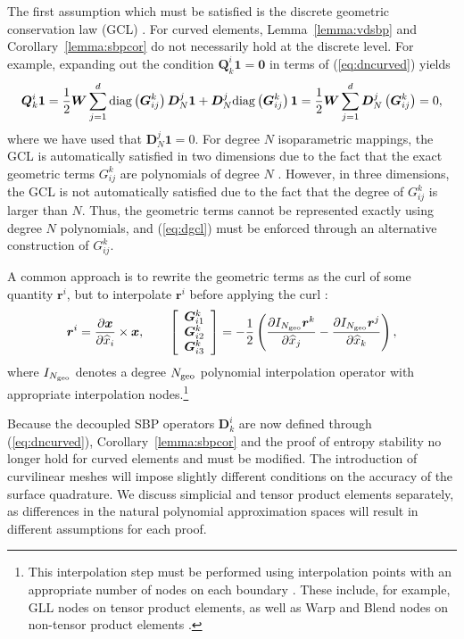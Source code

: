 \documentclass[review]{siamart0216}
\theoremstyle{assumption}
\renewcommand{\hat}[1]{\hat{#1}}
\newcommand{\pd}[2]{\frac{\partial#1}{\partial#2}}
\newcommand{\LRp}[1]{\left( #1 \right)}
\newcommand{\LRs}[1]{\left[ #1 \right]}
\renewcommand{\hat}{\widehat}
\newcommand{\diag}[1]{{\rm diag}\LRp{#1}}
\begin{document}
The first assumption which must be satisfied is the discrete geometric conservation law (GCL) \cite{thomas1979geometric, kopriva2006metric}.  For curved elements, Lemma~\ref{lemma:vdsbp} and Corollary~\ref{lemma:sbpcor} do not necessarily hold at the discrete level.  For example, expanding out the condition $\bm{Q}^i_k\bm{1} = \bm{0}$ in terms of (\ref{eq:dncurved}) yields
\begin{align}
\bm{Q}^i_k \bm{1} = \frac{1}{2} \bm{W}\sum_{j=1}^d \diag{\bm{G}^k_{ij}}{\bm{D}}^j_N \bm{1} + {\bm{D}}^j_N\diag{\bm{G}^k_{ij}}\bm{1} = \frac{1}{2}\bm{W}\sum_{j=1}^d {\bm{D}}^j_N\LRp{\bm{G}^k_{ij}} = 0,
\label{eq:dgcl}
\end{align}
where we have used that ${\bm{D}}^j_N \bm{1} = 0$.  For degree $N$ isoparametric mappings, the GCL is automatically satisfied in two dimensions due to the fact that the exact geometric terms ${G}^k_{ij}$ are polynomials of degree $N$ \cite{kopriva2006metric}.  However, in three dimensions, the GCL is not automatically satisfied due to the fact that the degree of $G^k_{ij}$ is larger than $N$.  Thus, the geometric terms cannot be represented exactly using degree $N$ polynomials, and (\ref{eq:dgcl}) must be enforced through an alternative construction of ${G}^k_{ij}$.  

A common approach is to rewrite the geometric terms as the curl of some quantity $\bm{r}^i$, but to interpolate $\bm{r}^i$ before applying the curl \cite{visbal2002use, kopriva2006metric, hindenlang2012explicit}:
\begin{align}
\bm{r}^i = { \pd{\bm{x}}{\hat{x}_i}\times \bm{x}}, \qquad
\LRs{\begin{array}{c}
\bm{G}^k_{i1}\\
\bm{G}^k_{i2}\\
\bm{G}^k_{i3}\end{array}} = -\frac{1}{2}\LRp{\pd{I_{N_{\rm geo}}\bm{r}^k}{\hat{x}_j}-\pd{I_{N_{\rm geo}}\bm{r}^j}{\hat{x}_k}}, 
\label{eq:iconscurl}
\end{align}
where $I_{N_{\rm geo}}$ denotes a degree $N_{\rm geo}$ polynomial interpolation operator with appropriate interpolation nodes.\footnote{This interpolation step must be performed using interpolation points with an appropriate number of nodes on each boundary \cite{chan2018discretely}.  These include, for example, GLL nodes on tensor product elements, as well as Warp and Blend nodes on non-tensor product elements \cite{warburton2006explicit, chan2015comparison}.}  

Because the decoupled SBP operators $\bm{D}^i_k$ are now defined through (\ref{eq:dncurved}), Corollary~\ref{lemma:sbpcor} and the proof of entropy stability no longer hold for curved elements and must be modified.  The introduction of curvilinear meshes will impose slightly different conditions on the accuracy of the surface quadrature.  We discuss simplicial and tensor product elements separately, as differences in the natural polynomial approximation spaces will result in different assumptions for each proof.
\end{document}
